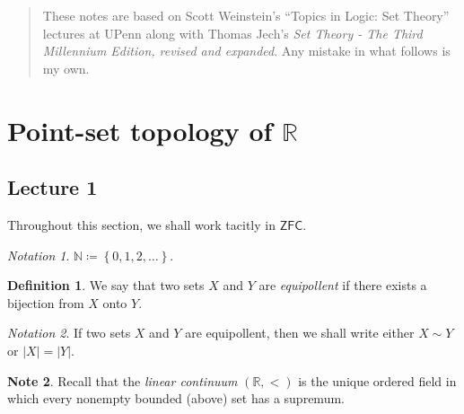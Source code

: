 \documentclass[10pt,letterpaper,cm]{nupset}
\theoremstyle{definition}
\newtheorem{definition}{Definition}[subsection]
\newtheorem{note}[definition]{Note}
\theoremstyle{theorem}
\theoremstyle{remark}
\newtheorem*{notation}{Notation}
\newcommand{\N}{\mathbb N}
\newcommand{\R}{\mathbb R}
\newcommand{\1}{\mathbf{1}}
\newcommand{\0}{\vec 0}
\newcommand{\zfc}{\mathsf{ZFC}}
\begin{document}
\thispagestyle{empty}
\begin{abstract}
These notes are based on Scott Weinstein's ``Topics in Logic: Set Theory'' lectures at UPenn along with  Thomas Jech's \textit{Set Theory - The Third Millennium Edition, revised and expanded}. Any mistake in what follows is my own.
\end{abstract}

\tableofcontents
\newpage

\section{Point-set topology of $\R$}

\subsection{Lecture 1}

Throughout this section, we shall  work tacitly in $\zfc$.

\begin{notation}
$\N \coloneqq \left\{0,1,2, \ldots \right\}$.
\end{notation}

\begin{definition}
We say that two sets $X$ and $Y$ are \textit{equipollent} if there exists a bijection from $X$ onto $Y$. 
\end{definition}

\begin{notation}
If two sets $X$ and $Y$ are equipollent, then we shall write either $X \sim Y$ or $\left\lvert{X}\right\rvert = \left\lvert{Y}\right\rvert$.
\end{notation}

\begin{note}
Recall that the \textit{linear continuum} $\left(\R, <\right)$ is the unique ordered field in which every nonempty bounded (above) set has a supremum.  
\end{note}
\end{document}
